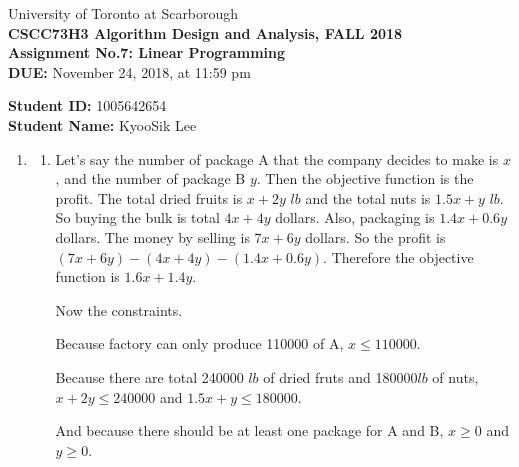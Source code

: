 \documentclass[a4paper,11pt]{article}
\begin{document}
\begin{center}
University of Toronto at Scarborough\\[0.1in]
{\bf CSCC73H3 Algorithm Design and Analysis, FALL 2018} \\[0.1in]
{\large{\bf Assignment No.7: Linear Programming }}\\[0.1in]
{\bf DUE:} November 24, 2018, at 11:59 pm
\end{center}


\vspace{0.1in}
\noindent
{\bf Student ID:} 1005642654 \\[0.15in]
{\bf Student Name:} KyooSik Lee
\vspace{0.3in}

\vspace{0.3in}
\begin{enumerate}

\item 

\begin{enumerate}
\item
Let's say the number of package A that the company decides to make is $x$, and the number of package B $y$. Then the objective function is the profit. The total dried fruits is $x+2y$ $lb$ and the total nuts is $1.5x + y$ $lb$. So buying the bulk is total $4x+4y$ dollars. Also, packaging is $1.4x + 0.6y$ dollars. The money by selling is $7x + 6y$ dollars. So the profit is $(7x + 6y)-(4x + 4y)-(1.4x+0.6y)$. Therefore the objective function is $1.6x + 1.4y$.

Now the constraints.

Because factory can only produce 110000 of A, $x\leq 110000$.

Because there are total 240000 $lb$ of dried fruts and 180000$lb$ of nuts, $x+2y \leq 240000$ and $1.5x+y \leq 180000$.

And because there should be at least one package for A and B, $x \geq 0$ and $y \geq 0$.


\end{enumerate}
\end{enumerate}
\end{document}
